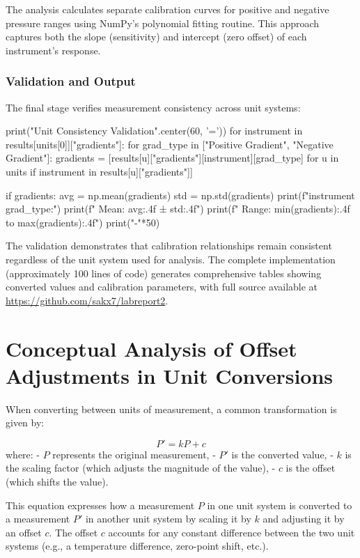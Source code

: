 \documentclass{article}
\begin{document}
The analysis calculates separate calibration curves for positive and negative pressure ranges using NumPy's polynomial fitting routine. This approach captures both the slope (sensitivity) and intercept (zero offset) of each instrument's response.

\subsubsection{Validation and Output}
The final stage verifies measurement consistency across unit systems:

\begin{python}
print("Unit Consistency Validation".center(60, '='))
for instrument in results[units[0]]["gradients"]:
    for grad_type in ["Positive Gradient", "Negative Gradient"]:
        gradients = [results[u]["gradients"][instrument][grad_type] 
                    for u in units if instrument in results[u]["gradients"]]
        
        if gradients:
            avg = np.mean(gradients)
            std = np.std(gradients)
            print(f"{instrument} {grad_type}:")
            print(f"  Mean: {avg:.4f} ± {std:.4f}")
            print(f"  Range: {min(gradients):.4f} to {max(gradients):.4f}")
            print("-"*50)
\end{python}

The validation demonstrates that calibration relationships remain consistent regardless of the unit system used for analysis. The complete implementation (approximately 100 lines of code) generates comprehensive tables showing converted values and calibration parameters, with full source available at \url{https://github.com/sakx7/labreport2}.

\newpage

\section{Conceptual Analysis of Offset Adjustments in Unit Conversions}

When converting between units of measurement, a common transformation is given by:

\[
P' = kP + c
\]
where:
- \( P \) represents the original measurement,
- \( P' \) is the converted value,
- \( k \) is the scaling factor (which adjusts the magnitude of the value),
- \( c \) is the offset (which shifts the value).

This equation expresses how a measurement \( P \) in one unit system is converted to a measurement \( P' \) in another unit system by scaling it by \( k \) and adjusting it by an offset \( c \). The offset \( c \) accounts for any constant difference between the two unit systems (e.g., a temperature difference, zero-point shift, etc.).
\end{document}
